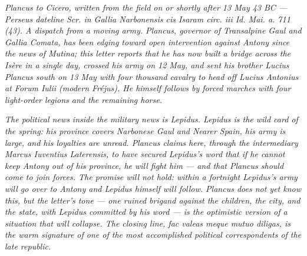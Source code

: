 
\textit{Plancus to Cicero, written from the field on or shortly
after 13 May 43 BC --- Perseus dateline \textit{Scr. in Gallia
Narbonensis cis Isaram circ. iii Id. Mai. a. 711 (43)}. A
dispatch from a moving army. Plancus, governor of Transalpine
Gaul and Gallia Comata, has been edging toward open
intervention against Antony since the news of Mutina; this
letter reports that he has now built a bridge across the
Is\`ere in a single day, crossed his army on 12 May, and sent
his brother Lucius Plancus south on 13 May with four thousand
cavalry to head off Lucius Antonius at Forum Iulii (modern
Fr\'ejus). He himself follows by forced marches with four
light-order legions and the remaining horse.}

\textit{The political news inside the military news is
Lepidus. Lepidus is the wild card of the spring: his province
covers Narbonese Gaul and Nearer Spain, his army is large,
and his loyalties are unread. Plancus claims here, through
the intermediary Marcus Iuventius Laterensis, to have secured
Lepidus's word that if he cannot keep Antony out of his
province, he will fight him --- and that Plancus should come
to join forces. The promise will not hold: within a fortnight
Lepidus's army will go over to Antony and Lepidus himself will
follow. Plancus does not yet know this, but the letter's tone
--- one ruined brigand against the children, the city, and
the state, with Lepidus committed by his word --- is the
optimistic version of a situation that will collapse. The
closing line, \textit{fac valeas meque mutuo diligas}, is the
warm signature of one of the most accomplished political
correspondents of the late republic.}
